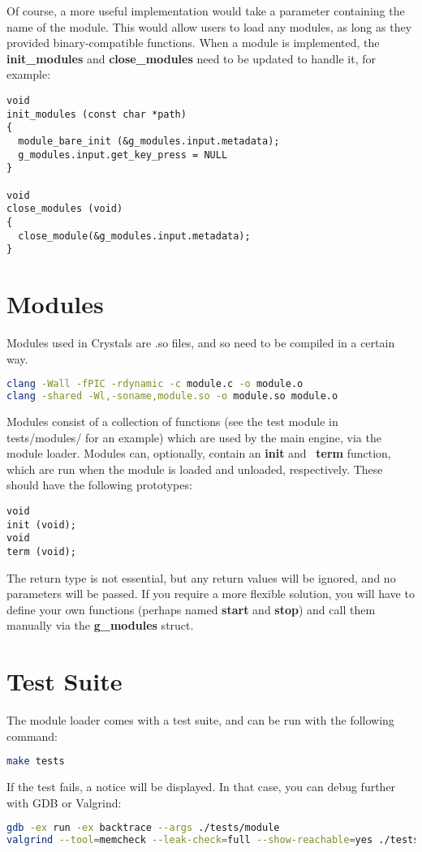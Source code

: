 \documentclass[12pt,a4paper]{article}
\begin{document}
Of course, a more useful implementation would take a parameter containing the name of the module. This would allow users to load any modules, as long as they provided binary-compatible functions. When a module is implemented, the \textbf{init\_modules} and \textbf{close\_modules} need to be updated to handle it, for example:

\begin{lstlisting}
void
init_modules (const char *path)
{
  module_bare_init (&g_modules.input.metadata);
  g_modules.input.get_key_press = NULL
}

void
close_modules (void)
{
  close_module(&g_modules.input.metadata);
}
\end{lstlisting}

\section{Modules}

Modules used in Crystals are .so files, and so need to be compiled in a certain way.

\begin{lstlisting}[language=bash]
clang -Wall -fPIC -rdynamic -c module.c -o module.o
clang -shared -Wl,-soname,module.so -o module.so module.o
\end{lstlisting}

Modules consist of a collection of functions (see the test module in tests/modules/ for an example) which are used by the main engine, via the module loader. Modules can, optionally, contain an \textbf{init} and \ \textbf{term} function, which are run when the module is loaded and unloaded, respectively. These should have the following prototypes:

\begin{lstlisting}
void
init (void);
void
term (void);
\end{lstlisting}

The return type is not essential, but any return values will be ignored, and no parameters will be passed. If you require a more flexible solution, you will have to define your own functions (perhaps named \textbf{start} and \textbf{stop}) and call them manually via the \textbf{g\_modules} struct.

\section{Test Suite}

The module loader comes with a test suite, and can be run with the following command:

\begin{lstlisting}[language=bash]
make tests
\end{lstlisting}

If the test fails, a notice will be displayed. In that case, you can debug further with GDB or Valgrind:

\begin{lstlisting}[language=bash]
gdb -ex run -ex backtrace --args ./tests/module
valgrind --tool=memcheck --leak-check=full --show-reachable=yes ./tests/module
\end{lstlisting}
\end{document}
